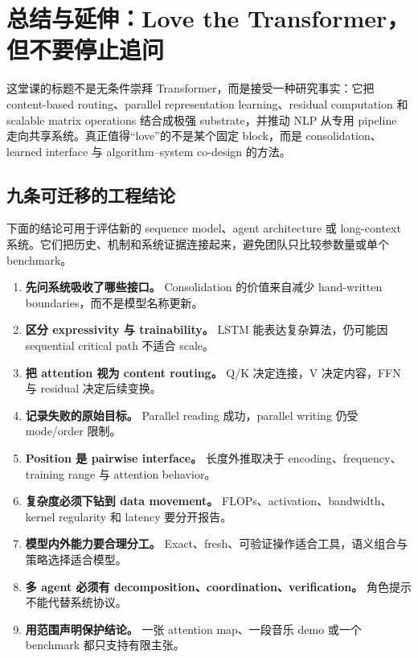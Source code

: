 \section{总结与延伸：Love the Transformer，但不要停止追问}

这堂课的标题不是无条件崇拜 Transformer，而是接受一种研究事实：它把 content-based routing、parallel representation learning、residual computation 和 scalable matrix operations 结合成极强 substrate，并推动 NLP 从专用 pipeline 走向共享系统。真正值得“love”的不是某个固定 block，而是 consolidation、learned interface 与 algorithm--system co-design 的方法。

\subsection{九条可迁移的工程结论}

下面的结论可用于评估新的 sequence model、agent architecture 或 long-context 系统。它们把历史、机制和系统证据连接起来，避免团队只比较参数量或单个 benchmark。

\begin{enumerate}
  \item \textbf{先问系统吸收了哪些接口。} Consolidation 的价值来自减少 hand-written boundaries，而不是模型名称更新。
  \item \textbf{区分 expressivity 与 trainability。} LSTM 能表达复杂算法，仍可能因 sequential critical path 不适合 scale。
  \item \textbf{把 attention 视为 content routing。} Q/K 决定连接，V 决定内容，FFN 与 residual 决定后续变换。
  \item \textbf{记录失败的原始目标。} Parallel reading 成功，parallel writing 仍受 mode/order 限制。
  \item \textbf{Position 是 pairwise interface。} 长度外推取决于 encoding、frequency、training range 与 attention behavior。
  \item \textbf{复杂度必须下钻到 data movement。} FLOPs、activation、bandwidth、kernel regularity 和 latency 要分开报告。
  \item \textbf{模型内外能力要合理分工。} Exact、fresh、可验证操作适合工具，语义组合与策略选择适合模型。
  \item \textbf{多 agent 必须有 decomposition、coordination、verification。} 角色提示不能代替系统协议。
  \item \textbf{用范围声明保护结论。} 一张 attention map、一段音乐 demo 或一个 benchmark 都只支持有限主张。
\end{enumerate}

